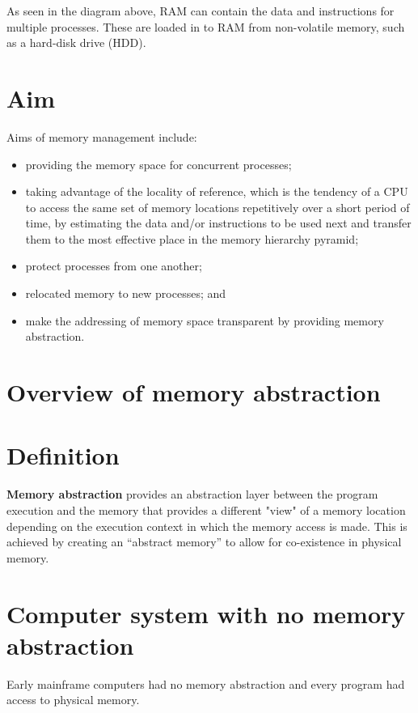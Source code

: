 \documentclass[a4paper]{systems-software}
\begin{document}
As seen in the diagram above, RAM can contain the data and instructions for multiple processes. These are loaded in to RAM from non-volatile memory, such as a hard-disk drive (HDD).


\section*{Aim}

Aims of memory management include:
\begin{itemize}
	\item providing the memory space for concurrent processes;
	\item taking advantage of the locality of reference, which is the tendency of a CPU to access the same set of memory locations repetitively over a short period of time, by estimating the data and/or instructions to be used next and transfer them to the most effective place in the memory hierarchy pyramid;
	\item protect processes from one another;
	\item relocated memory to new processes; and
	\item make the addressing of memory space transparent by providing memory abstraction.
\end{itemize}


\section{Overview of memory abstraction}

\section*{Definition}

\textbf{Memory abstraction} provides an abstraction layer between the program execution and the memory that provides a different "view" of a memory location depending on the execution context in which the memory access is made. This is achieved by creating an “abstract memory” to allow for co-existence in physical memory.


\section*{Computer system with no memory abstraction}

Early mainframe computers had no memory abstraction and every program had access to physical memory.
\end{document}
